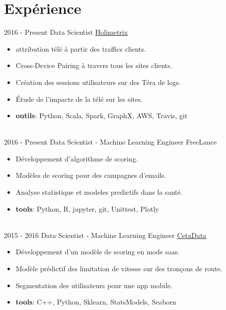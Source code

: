\documentclass[letterpaper]{twentysecondcvfr} %
\begin{document}
\makeprofile %



\section{Exp\'erience}{\faAlignJustify}

\begin{twenty} %
\twentyitem
    	{2016 -}
		{Present}
        {Data Scientist}
        {\href{http://www.holimetrix.ccom/}{Holimetrix}}
        {}
        {
				\begin{itemize}
				\item attribution t\'el\'e \`a partir des traffics clients. 
				\item Cross-Device Pairing \`a travers tous les sites clients.
				\item Cr\'eation des sessions utilisateurs sur des T\'era de logs.
				\item \'Etude de l'impacte de la t\'el\'e sur les sites.
				\item \textbf{outils}: Python, Scala, Spark, GraphX, AWS, Travis, git
				\end{itemize}} \\
				
	\twentyitem
    	{2016 -}
		{Present}
        {Data Scientist - Machine Learning Engineer}
        {FreeLance}
        {}
        {\begin{itemize}
        \item D\'eveloppement d'algorithme de scoring.
        \item Mod\`eles de scoring pour des campagnes d'emails. 
        \item Analyse statistique et modeles predictifs dans la sant\'e. 
				\item \textbf{tools}: Python, R, jupyter, git, Unittest, Plotly
    \end{itemize}}\\
		
    \twentyitem
   		{2015 - 2016}
		{}
        {Data Scientist - Machine Learning Engineer}
        {\href{http://www.cetadata.com/}{CetaData}}
        {}
        {\begin{itemize}
				\item D\'eveloppement d'un mod\`ele de scoring en mode saas.
        \item Mod\`ele pr\'edictif des limitation de vitesse sur des tron\c cons de route.
				\item Segmentation des utilisateurs pour une app mobile.
				\item \textbf{tools}: C++, Python, Sklearn, StatsModels, Seaborn
    \end{itemize}} \\
		

\end{twenty}
\end{document}
